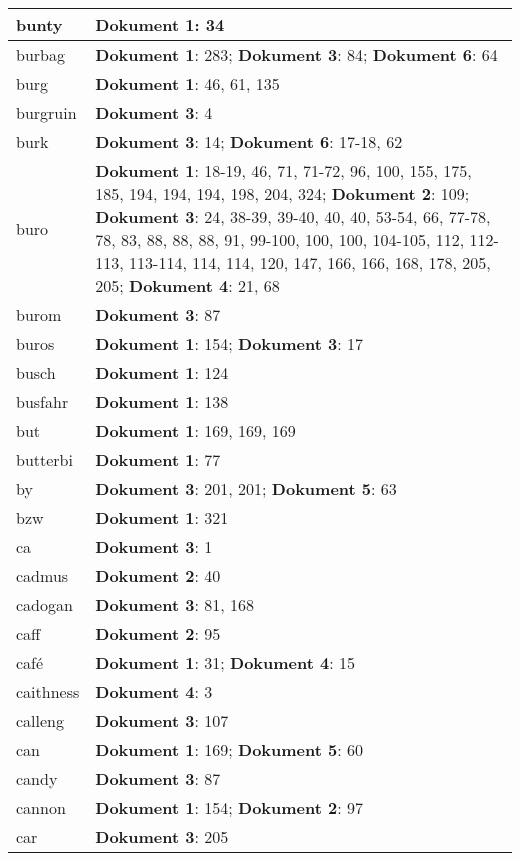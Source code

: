 \documentclass[a5paper]{article}
\begin{document}
\begin{longtable}[l]{|l|p{3in}|}
\hline
bunty & \textbf{Dokument 1}: 34 \\
\hline
burbag & \textbf{Dokument 1}: 283; \textbf{Dokument 3}: 84; \textbf{Dokument 6}: 64 \\
\hline
burg & \textbf{Dokument 1}: 46, 61, 135 \\
\hline
burgruin & \textbf{Dokument 3}: 4 \\
\hline
burk & \textbf{Dokument 3}: 14; \textbf{Dokument 6}: 17-18, 62 \\
\hline
buro & \textbf{Dokument 1}: 18-19, 46, 71, 71-72, 96, 100, 155, 175, 185, 194, 194, 194, 198, 204, 324; \textbf{Dokument 2}: 109; \textbf{Dokument 3}: 24, 38-39, 39-40, 40, 40, 53-54, 66, 77-78, 78, 83, 88, 88, 88, 91, 99-100, 100, 100, 104-105, 112, 112-113, 113-114, 114, 114, 120, 147, 166, 166, 168, 178, 205, 205; \textbf{Dokument 4}: 21, 68 \\
\hline
burom & \textbf{Dokument 3}: 87 \\
\hline
buros & \textbf{Dokument 1}: 154; \textbf{Dokument 3}: 17 \\
\hline
busch & \textbf{Dokument 1}: 124 \\
\hline
busfahr & \textbf{Dokument 1}: 138 \\
\hline
but & \textbf{Dokument 1}: 169, 169, 169 \\
\hline
butterbi & \textbf{Dokument 1}: 77 \\
\hline
by & \textbf{Dokument 3}: 201, 201; \textbf{Dokument 5}: 63 \\
\hline
bzw & \textbf{Dokument 1}: 321 \\
\hline
ca & \textbf{Dokument 3}: 1 \\
\hline
cadmus & \textbf{Dokument 2}: 40 \\
\hline
cadogan & \textbf{Dokument 3}: 81, 168 \\
\hline
caff & \textbf{Dokument 2}: 95 \\
\hline
café & \textbf{Dokument 1}: 31; \textbf{Dokument 4}: 15 \\
\hline
caithness & \textbf{Dokument 4}: 3 \\
\hline
calleng & \textbf{Dokument 3}: 107 \\
\hline
can & \textbf{Dokument 1}: 169; \textbf{Dokument 5}: 60 \\
\hline
candy & \textbf{Dokument 3}: 87 \\
\hline
cannon & \textbf{Dokument 1}: 154; \textbf{Dokument 2}: 97 \\
\hline
car & \textbf{Dokument 3}: 205 \\

\end{longtable}
\end{document}
